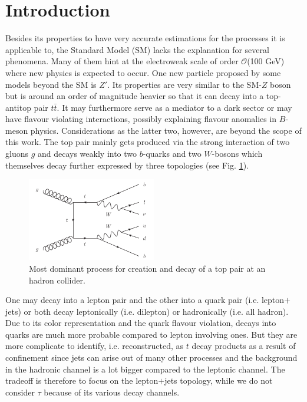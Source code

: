 
\section{Introduction}
Besides its properties to have very accurate estimations for the processes it is applicable to, the Standard Model (SM) lacks the explanation for 
several phenomena. Many of them hint at the electroweak scale of order $\mathcal{O}$(100 GeV) where new physics is expected to occur. One new particle
proposed by some models beyond the SM is $Z'$. Its properties are very similar to the SM-$Z$ boson but is around an order of magnitude heavier so that
it can decay into a top-antitop pair $t\bar t$. It may furthermore serve as a mediator to a dark sector or may have flavour violating interactions, 
possibly 
explaining flavour anomalies in $B$-meson physics. Considerations as the latter two, however, are beyond the scope of this work. The top pair mainly
gets produced via the strong interaction of two gluons $g$ and decays weakly into two $b$-quarks and two $W$-bosons which themselves decay further 
expressed by three topologies (see Fig. \ref{pic:feynman}). 
\begin{figure}
 \includegraphics[width=0.5\textwidth]{../pics/e4.pdf}
 \caption{Most dominant process for creation and decay of a top pair at an hadron collider.}
 \label{pic:feynman}
\end{figure}
One may decay into a lepton pair and the other into a quark pair (i.e. lepton$+$jets) or both decay leptonically 
(i.e. dilepton) or hadronically (i.e. all hadron). Due to its color representation and the quark flavour violation, decays into quarks are much more 
probable compared to lepton involving ones. But they are more complicate to identify, i.e. reconstructed, as $t$ decay products as a result of 
confinement since jets can arise out of many other processes and the background in the hadronic channel is a lot bigger compared to the leptonic
channel. The tradeoff is therefore to focus on the lepton$+$jets topology, while we do not consider $\tau$ because of its various decay channels.
